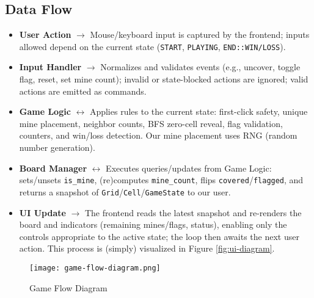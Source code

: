 \documentclass[11pt]{article}
\begin{document}
\subsection{Data Flow}
\begin{itemize}
  \item \textbf{User Action} $\rightarrow$ Mouse/keyboard input is captured by the frontend; inputs allowed depend on the current state (\texttt{START}, \texttt{PLAYING}, \texttt{END::WIN/LOSS}).
  \item \textbf{Input Handler} $\rightarrow$ Normalizes and validates events (e.g., uncover, toggle flag, reset, set mine count); invalid or state-blocked actions are ignored; valid actions are emitted as commands.
  \item \textbf{Game Logic} $\leftrightarrow$ Applies rules to the current state: first-click safety, unique mine placement, neighbor counts, BFS zero-cell reveal, flag validation, counters, and win/loss detection. Our mine placement uses RNG (random number generation).
  \item \textbf{Board Manager} $\leftrightarrow$ Executes queries/updates from Game Logic: sets/unsets \texttt{is\_mine}, (re)computes \texttt{mine\_count}, flips \texttt{covered}/\texttt{flagged}, and returns a snapshot of \texttt{Grid}/\texttt{Cell}/\texttt{GameState} to our user.
  \item \textbf{UI Update} $\rightarrow$ The frontend reads the latest snapshot and re-renders the board and indicators (remaining mines/flags, status), enabling only the controls appropriate to the active state; the loop then awaits the next user action. This process is (simply) visualized in Figure \ref{fig:ui-diagram}.
\end{itemize}
\begin{figure}[ht]
\centering
\texttt{[image: game-flow-diagram.png]}
\caption{Game Flow Diagram}
\label{fig:game-flow}
\end{figure}
\end{document}
